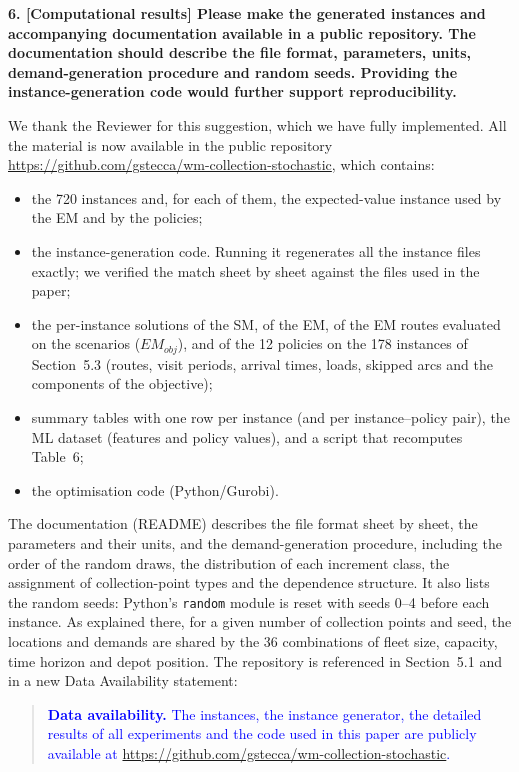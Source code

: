 \documentclass[11pt,a4paper]{article}
\newcommand{\rev}[1]{\textcolor{blue}{#1}}
\newenvironment{comment}{\par\medskip\noindent\bfseries}{\par\medskip}
\begin{document}
\begin{comment}
6. [Computational results] Please make the generated instances and accompanying documentation available in a public repository. The documentation should describe the file format, parameters, units, demand-generation procedure and random seeds. Providing the instance-generation code would further support reproducibility.
\end{comment}

We thank the Reviewer for this suggestion, which we have fully implemented. All the material is now available in the public repository \rev{\url{https://github.com/gstecca/wm-collection-stochastic}}, which contains:
\begin{itemize}[leftmargin=*]
\item the 720 instances and, for each of them, the expected-value instance used by the EM and by the policies;
\item the instance-generation code. Running it regenerates all the instance files exactly; we verified the match sheet by sheet against the files used in the paper;
\item the per-instance solutions of the SM, of the EM, of the EM routes evaluated on the scenarios ($EM_{obj}$), and of the 12 policies on the 178 instances of Section~5.3 (routes, visit periods, arrival times, loads, skipped arcs and the components of the objective);
\item summary tables with one row per instance (and per instance--policy pair), the ML dataset (features and policy values), and a script that recomputes Table~6;
\item the optimisation code (Python/Gurobi).
\end{itemize}
The documentation (README) describes the file format sheet by sheet, the parameters and their units, and the demand-generation procedure, including the order of the random draws, the distribution of each increment class, the assignment of collection-point types and the dependence structure. It also lists the random seeds: Python's \texttt{random} module is reset with seeds 0--4 before each instance. As explained there, for a given number of collection points and seed, the locations and demands are shared by the 36 combinations of fleet size, capacity, time horizon and depot position. The repository is referenced in Section~5.1 and in a new Data Availability statement:

\begin{quote}\rev{%
\textbf{Data availability.} The instances, the instance generator, the detailed results of all experiments and the code used in this paper are publicly available at \url{https://github.com/gstecca/wm-collection-stochastic}.}
\end{quote}
\end{document}
